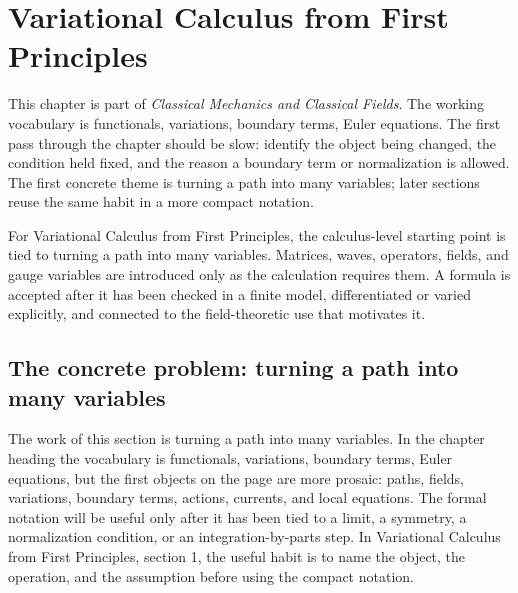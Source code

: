 \chapter{Variational Calculus from First Principles}


This chapter is part of \emph{Classical Mechanics and Classical Fields}.  The working vocabulary is functionals, variations, boundary terms, Euler equations.  The first pass through the chapter should be slow: identify the object being changed, the condition held fixed, and the reason a boundary term or normalization is allowed.  The first concrete theme is turning a path into many variables; later sections reuse the same habit in a more compact notation.

For Variational Calculus from First Principles, the calculus-level starting point is tied to turning a path into many variables.  Matrices, waves, operators, fields, and gauge variables are introduced only as the calculation requires them.  A formula is accepted after it has been checked in a finite model, differentiated or varied explicitly, and connected to the field-theoretic use that motivates it.

\section{The concrete problem: turning a path into many variables}













The work of this section is turning a path into many variables.  In the chapter heading the vocabulary is functionals, variations, boundary terms, Euler equations, but the first objects on the page are more prosaic: paths, fields, variations, boundary terms, actions, currents, and local equations.  The formal notation will be useful only after it has been tied to a limit, a symmetry, a normalization condition, or an integration-by-parts step.  In Variational Calculus from First Principles, section 1, the useful habit is to name the object, the operation, and the assumption before using the compact notation.

